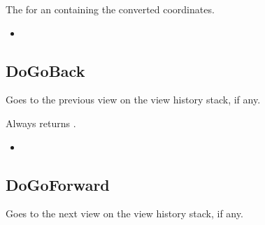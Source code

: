 \documentclass[letterpaper,12pt,english,openany,oneside]{sphinxmanual}
\begin{document}

The  for an  containing the converted coordinates.

\label{\detokenize{IAC_API_OLE_Objects:related-methods-49}}
\begin{itemize}
\item {} 
 

\end{itemize}




\subsection{DoGoBack}
\label{\detokenize{IAC_API_OLE_Objects:dogoback}}
Goes to the previous view on the view history stack, if any.


\begin{sphinxVerbatim}[commandchars=\\\{\}]
 
\end{sphinxVerbatim}


Always returns .

\label{\detokenize{IAC_API_OLE_Objects:related-methods-50}}
\begin{itemize}
\item {} 
 

\end{itemize}




\subsection{DoGoForward}
\label{\detokenize{IAC_API_OLE_Objects:dogoforward}}
Goes to the next view on the view history stack, if any.


\begin{sphinxVerbatim}[commandchars=\\\{\}]
 
\end{sphinxVerbatim}
\end{document}
